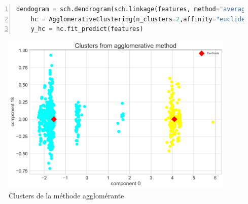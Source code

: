 \begin{lstlisting}[language=Python,label={pca_code}, basicstyle=\scriptsize, frame=l,framesep=4.5mm,framexleftmargin=2.5mm,tabsize=2,numbers=left,fillcolor=\color{blueforest!70},rulecolor=\color{blueforest},numberstyle=\normalfont\tiny\color{white}]
	dendogram = sch.dendrogram(sch.linkage(features, method="average"))
	hc = AgglomerativeClustering(n_clusters=2,affinity="euclidean",linkage="average")
	y_hc = hc.fit_predict(features)
\end{lstlisting}


\begin{figure}[H]
    \centering
    \qquad
\end{figure}

\begin{figure}[H]
	\begin{center}
		\includegraphics[scale=0.2]{images/chapitre7/agglo_clusters.png}
	\end{center}
	\caption{Clusters de la méthode agglomérante}
	\label{agglo_clusters}
\end{figure}


